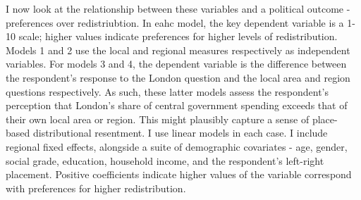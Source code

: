 \documentclass[
]{article}
\begin{document}
I now look at the relationship between these variables and a political
outcome - preferences over redistriubtion. In eahc model, the key
dependent variable is a 1-10 scale; higher values indicate preferences
for higher levels of redistribution. Models 1 and 2 use the local and
regional measures respectively as independent variables. For models 3
and 4, the dependent variable is the difference between the respondent's
response to the London question and the local area and region questions
respectively. As such, these latter models assess the respondent's
perception that London's share of central government spending exceeds
that of their own local area or region. This might plausibly capture a
sense of place-based distributional resentment. I use linear models in
each case. I include regional fixed effects, alongside a suite of
demographic covariates - age, gender, social grade, education, household
income, and the respondent's left-right placement. Positive coefficients
indicate higher values of the variable correspond with preferences for
higher redistribution. \newpage
\end{document}

